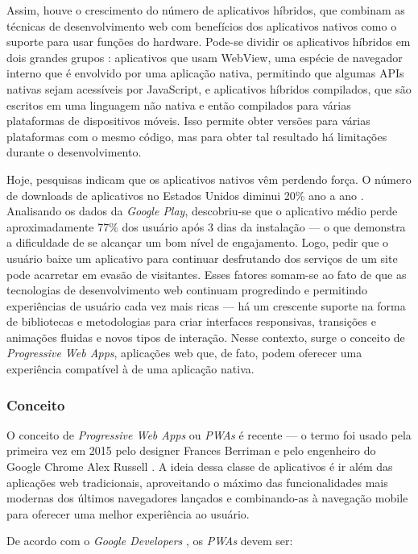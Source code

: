 Assim, houve o crescimento do número de aplicativos híbridos, que combinam as técnicas de desenvolvimento web com benefícios dos aplicativos nativos como o suporte para usar funções do hardware. Pode-se dividir os aplicativos híbridos em dois grandes grupos \cite{rudolph}: aplicativos que usam WebView, uma espécie de navegador interno que é envolvido por uma aplicação nativa, permitindo que algumas APIs nativas sejam acessíveis por JavaScript, e aplicativos híbridos compilados, que são escritos em uma linguagem não nativa e então compilados para várias plataformas de dispositivos móveis. Isso permite obter versões para várias plataformas com o mesmo código, mas para obter tal resultado há limitações durante o desenvolvimento.

Hoje, pesquisas indicam que os aplicativos nativos vêm perdendo força. O número de downloads de aplicativos no Estados Unidos diminui 20\% ano a ano \cite{benson}. Analisando os dados da \emph{Google Play}, descobriu-se que o aplicativo médio perde aproximadamente 77\% dos usuário após 3 dias da instalação \cite{chen} --- o que demonstra a dificuldade de se alcançar um bom nível de engajamento. Logo, pedir que o usuário baixe um aplicativo para continuar desfrutando dos serviços de um site pode acarretar em evasão de visitantes. Esses fatores somam-se ao fato de que as tecnologias de desenvolvimento web continuam progredindo e permitindo experiências de usuário cada vez mais ricas --- há um crescente suporte na forma de bibliotecas e metodologias para criar interfaces responsivas, transições e animações fluidas e novos tipos de interação. Nesse contexto, surge o conceito de \textit{Progressive Web Apps}, aplicações web que, de fato, podem oferecer uma experiência compatível à de uma aplicação nativa.

\subsubsection{Conceito}
O conceito de \textit{Progressive Web Apps} ou \emph{PWAs} é recente --- o termo foi usado pela primeira vez em 2015 pelo designer Frances Berriman e pelo engenheiro do Google Chrome Alex Russell \cite{russell}. A ideia dessa classe de aplicativos é ir além das aplicações web tradicionais, aproveitando o máximo das funcionalidades mais modernas dos últimos navegadores lançados e combinando-as à navegação mobile para oferecer uma melhor experiência ao usuário.

De acordo com o  \emph{Google Developers} \cite{googledevpwa}, os \emph{PWAs} devem ser:

